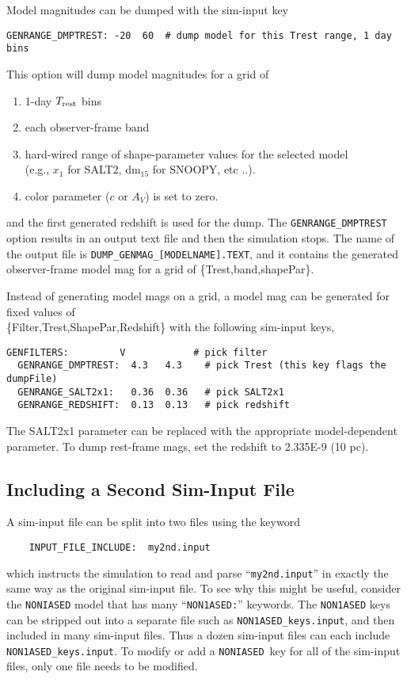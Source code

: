 \documentclass[12pt]{article}
\newcommand{\Trest}{T_{\rm rest}}
\newcommand{\NONIA}{{\tt NONIASED}}
\begin{document}
Model magnitudes can be dumped with the sim-input key
\begin{Verbatim}[frame=single]
  GENRANGE_DMPTREST: -20  60  # dump model for this Trest range, 1 day bins
\end{Verbatim}
%
This option will dump model magnitudes for a grid of
\begin{enumerate}
 \item 1-day $\Trest$ bins
 \item each observer-frame band
 \item hard-wired range of shape-parameter values for the
   selected model \\ 
   (e.g., $x_1$ for SALT2, dm$_{15}$ for SNOOPY, etc ..).
 \item color parameter ($c$ or $A_V$) is set to zero.
\end{enumerate}
%
and the first generated redshift is used for the dump.
The {\tt GENRANGE\_DMPTREST} option results in an output
text file and then the simulation stops. The name of the 
output file is {\tt DUMP\_GENMAG\_[MODELNAME].TEXT},
and it contains the generated observer-frame model mag for 
a grid of \{Trest,band,shapePar\}. 

 
Instead of generating model mags on a grid,
a model mag can be generated for fixed values of \\ 
\{Filter,Trest,ShapePar,Redshift\} with the following
sim-input keys,
%
\begin{Verbatim}[frame=single]
  GENFILTERS:         V            # pick filter
  GENRANGE_DMPTREST:  4.3   4.3    # pick Trest (this key flags the dumpFile)
  GENRANGE_SALT2x1:   0.36  0.36   # pick SALT2x1
  GENRANGE_REDSHIFT:  0.13  0.13   # pick redshift
\end{Verbatim}
%
The SALT2x1 parameter can be replaced with the appropriate
model-dependent parameter. To dump rest-frame mags,
set the redshift to 2.335E-9 (10 pc).

   \subsection{Including a Second Sim-Input File}
   \label{subsec:split_siminput}

A sim-input file can be split into two files
using the keyword 
\begin{verbatim}
    INPUT_FILE_INCLUDE:  my2nd.input
\end{verbatim}
%
which instructs the simulation to read and parse
``{\tt my2nd.input}'' in exactly the same way as
the original sim-input file. To see why this might
be useful, consider the {\NONIA} model that has
many ``{\tt NON1ASED:}'' keywords. 
The {\tt NON1ASED} keys can be stripped out into a separate 
file such as {\tt NON1ASED\_keys.input}, and then included
in many sim-input files. 
Thus a dozen sim-input files can each include
{\tt NON1ASED\_keys.input}.
To modify or add a \NONIA\ key for all of the 
sim-input files, only one file needs to be modified.
\end{document}
